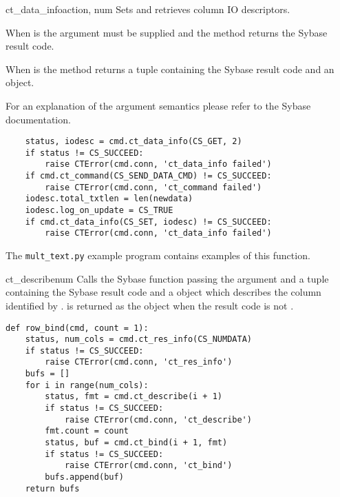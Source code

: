 \begin{methoddesc}[CS_COMMAND]{ct_data_info}{action, num }
Sets and retrieves column IO descriptors.

When  is  the  argument
must be supplied and the method returns the Sybase result code.

When  is  the method returns a tuple
containing the Sybase result code and an  object.

For an explanation of the argument semantics please refer to the
Sybase documentation.

\begin{verbatim}
    status, iodesc = cmd.ct_data_info(CS_GET, 2)
    if status != CS_SUCCEED:
        raise CTError(cmd.conn, 'ct_data_info failed')
    if cmd.ct_command(CS_SEND_DATA_CMD) != CS_SUCCEED:
        raise CTError(cmd.conn, 'ct_command failed')
    iodesc.total_txtlen = len(newdata)
    iodesc.log_on_update = CS_TRUE
    if cmd.ct_data_info(CS_SET, iodesc) != CS_SUCCEED:
        raise CTError(cmd.conn, 'ct_data_info failed')
\end{verbatim}

The \texttt{mult_text.py} example program contains examples of this
function.
\end{methoddesc}

\begin{methoddesc}[CS_COMMAND]{ct_describe}{num}
Calls the Sybase  function passing the
 argument and a tuple containing the Sybase result code and
a  object which describes the column identified by
.  is returned as the  object
when the result code is not .

\begin{verbatim}
def row_bind(cmd, count = 1):
    status, num_cols = cmd.ct_res_info(CS_NUMDATA)
    if status != CS_SUCCEED:
        raise CTError(cmd.conn, 'ct_res_info')
    bufs = []
    for i in range(num_cols):
        status, fmt = cmd.ct_describe(i + 1)
        if status != CS_SUCCEED:
            raise CTError(cmd.conn, 'ct_describe')
        fmt.count = count
        status, buf = cmd.ct_bind(i + 1, fmt)
        if status != CS_SUCCEED:
            raise CTError(cmd.conn, 'ct_bind')
        bufs.append(buf)
    return bufs
\end{verbatim}
\end{methoddesc}

